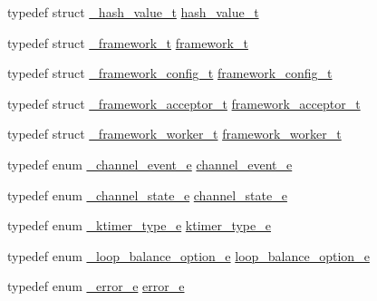 \begin{DoxyCompactItemize}
\item 
typedef struct \hyperlink{a00014}{\+\_\+hash\+\_\+value\+\_\+t} \hyperlink{a00047_af7ecd66aeef0ce1b0495e5f65e77733e_af7ecd66aeef0ce1b0495e5f65e77733e}{hash\+\_\+value\+\_\+t}
\item 
typedef struct \hyperlink{a00011}{\+\_\+framework\+\_\+t} \hyperlink{a00047_a6149d769f6f07ed14a40a271c95d8463_a6149d769f6f07ed14a40a271c95d8463}{framework\+\_\+t}
\item 
typedef struct \hyperlink{a00010}{\+\_\+framework\+\_\+config\+\_\+t} \hyperlink{a00047_a55b26efa9e6ee05514d087ba2593a54b_a55b26efa9e6ee05514d087ba2593a54b}{framework\+\_\+config\+\_\+t}
\item 
typedef struct \hyperlink{a00009}{\+\_\+framework\+\_\+acceptor\+\_\+t} \hyperlink{a00047_ab0952db3c97c4760192720875e69d040_ab0952db3c97c4760192720875e69d040}{framework\+\_\+acceptor\+\_\+t}
\item 
typedef struct \hyperlink{a00012}{\+\_\+framework\+\_\+worker\+\_\+t} \hyperlink{a00047_aeb7a44e6b579659a8aae81f3ab819af3_aeb7a44e6b579659a8aae81f3ab819af3}{framework\+\_\+worker\+\_\+t}
\item 
typedef enum \hyperlink{a00047_a1460362ccf3a6ba930a1a3ac2f73f3ea_a1460362ccf3a6ba930a1a3ac2f73f3ea}{\+\_\+channel\+\_\+event\+\_\+e} \hyperlink{a00047_a5ad43ab162fdf9ad53cde10ed3d87d99_a5ad43ab162fdf9ad53cde10ed3d87d99}{channel\+\_\+event\+\_\+e}
\item 
typedef enum \hyperlink{a00047_a18bbc160902cdba0f52f5a3cd879b47f_a18bbc160902cdba0f52f5a3cd879b47f}{\+\_\+channel\+\_\+state\+\_\+e} \hyperlink{a00047_a1956eea3012f780b5d592a9d09d9873c_a1956eea3012f780b5d592a9d09d9873c}{channel\+\_\+state\+\_\+e}
\item 
typedef enum \hyperlink{a00047_a7945681f6589a5f4f6cf55f4f4092d28_a7945681f6589a5f4f6cf55f4f4092d28}{\+\_\+ktimer\+\_\+type\+\_\+e} \hyperlink{a00047_a42e924130e6eb3bd995344f6d3f3e918_a42e924130e6eb3bd995344f6d3f3e918}{ktimer\+\_\+type\+\_\+e}
\item 
typedef enum \hyperlink{a00047_a0f82b35b603ffed92ea1a74205f10781_a0f82b35b603ffed92ea1a74205f10781}{\+\_\+loop\+\_\+balance\+\_\+option\+\_\+e} \hyperlink{a00047_a6c87150c8f33855c3427c783480fd8ba_a6c87150c8f33855c3427c783480fd8ba}{loop\+\_\+balance\+\_\+option\+\_\+e}
\item 
typedef enum \hyperlink{a00047_ad8bc998d415be9115a064a8307df0ed5_ad8bc998d415be9115a064a8307df0ed5}{\+\_\+error\+\_\+e} \hyperlink{a00047_a884b5eeef8214526df297659611c7d9b_a884b5eeef8214526df297659611c7d9b}{error\+\_\+e}

\end{DoxyCompactItemize}
